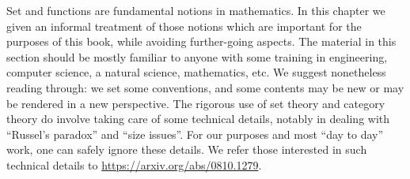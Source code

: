 


Set and functions are fundamental notions in mathematics. In this chapter we given an informal treatment of those notions which are important for the purposes of this book, while avoiding further-going aspects. The material in this section should be mostly familiar to anyone with some training in engineering, computer science, a natural science, mathematics, etc. We suggest nonetheless reading through: we set some conventions, and some contents may be new or may be rendered in a new perspective. The rigorous use of set theory and category theory do involve taking care of some technical details, notably in dealing with ``Russel's paradox'' and ``size issues''. For our purposes and most ``day to day'' work, one can safely ignore these details. We refer those interested in such technical details to \url{https://arxiv.org/abs/0810.1279}.  


\label{ch:sets}







